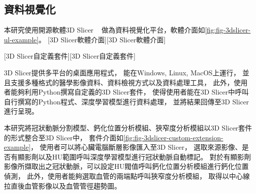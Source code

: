 \documentclass[class=NCU_thesis, crop=false]{standalone}
\begin{document}
\subsection{資料視覺化}
本研究使用開源軟體3D Slicer
~\cite{theslicercommunity3DSlicerImage,fedorov3DSlicerImage2012,geringIntegratedVisualizationSystem1999,geringIntegratedVisualizationSystem2001,kapurIncreasingImpactMedical2016,kikinis3DSlicerPlatform2014,pieperNAMICKitITK2006}
做為資料視覺化平台，軟體介面如\cref{fig:fig-3dslicer-ul-example}。
[3D Slicer軟體介面][3D Slicer軟體介面]

[3D Slicer自定義套件][3D Slicer自定義套件]

3D Slicer提供多平台的桌面應用程式，
能在Windows, Linux, MacOS上運行，
並且支援多種格式的醫學影像資料、資料檢視方式以及資料處理工具，
此外，使用者能夠利用Python撰寫自定義的3D Slicer套件，
使得使用者能在3D Slicer中呼叫自行撰寫的Python程式、深度學習模型進行資料處理，
並將結果回傳至3D Slicer進行呈現。

本研究將冠狀動脈分割模型、鈣化位置分析模組、狹窄度分析模組以3D Slicer套件的形式整合至3D Slicer中，
套件介面如\cref{fig:fig-3dslicer-custom-extension-example}，
使用者可以將心臟電腦斷層影像匯入至3D Slicer，
選取來源影像、是否有顯影劑以及HU範圍呼叫深度學習模型進行冠狀動脈自動標記。
對於有顯影劑影像所擷取出之冠狀動脈，可以設定HU閥值呼叫鈣化位置分析模組進行鈣化位置偵測，
此外，使用者能夠選取血管的兩端點呼叫狹窄度分析模組，
取得以中心線拉直後血管影像以及血管管徑趨勢圖。
\end{document}
